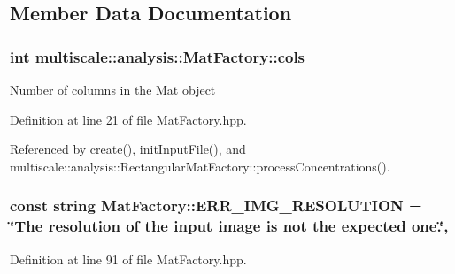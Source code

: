 \subsection{Member Data Documentation}
\hypertarget{classmultiscale_1_1analysis_1_1MatFactory_a9514356fe5226eaa31a4e61ca62a027c}{
\subsubsection[{cols}]{\setlength{\rightskip}{0pt plus 5cm}int multiscale\-::analysis\-::\-Mat\-Factory\-::cols\hspace{0.3cm}{\ttfamily [protected]}}}\label{classmultiscale_1_1analysis_1_1MatFactory_a9514356fe5226eaa31a4e61ca62a027c}
Number of columns in the Mat object 

Definition at line 21 of file Mat\-Factory.\-hpp.



Referenced by create(), init\-Input\-File(), and multiscale\-::analysis\-::\-Rectangular\-Mat\-Factory\-::process\-Concentrations().

\hypertarget{classmultiscale_1_1analysis_1_1MatFactory_ab5e9403dc7f8465189d444f909d473e7}{
\subsubsection[{E\-R\-R\-\_\-\-I\-M\-G\-\_\-\-R\-E\-S\-O\-L\-U\-T\-I\-O\-N}]{\setlength{\rightskip}{0pt plus 5cm}const string Mat\-Factory\-::\-E\-R\-R\-\_\-\-I\-M\-G\-\_\-\-R\-E\-S\-O\-L\-U\-T\-I\-O\-N = \char`\"{}The resolution of the input image is not the expected one.\char`\"{}\hspace{0.3cm}{\ttfamily [static]}, {\ttfamily [protected]}}}\label{classmultiscale_1_1analysis_1_1MatFactory_ab5e9403dc7f8465189d444f909d473e7}


Definition at line 91 of file Mat\-Factory.\-hpp.



